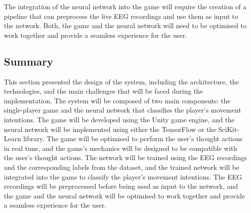 The integration of the neural network into the game will require the creation of a pipeline that can preprocess the live EEG recordings and use them as input to the network.
Both, the game and the neural network will need to be optimised to work together and provide a seamless experience for the user.

\subsection{Summary}
This section presented the design of the system, including the architecture, the technologies, and the main challenges that will be faced during the implementation.
The system will be composed of two main components: the single-player game and the neural network that classifies the player's movement intentions.
The game will be developed using the Unity game engine, and the neural network will be implemented using either the TensorFlow or the SciKit-Learn library.
The game will be optimised to perform the user's thought actions in real time, and the game's mechanics will be designed to be compatible with the user's thought actions.
The network will be trained using the EEG recordings and the corresponding labels from the dataset, and the trained network will be integrated into the game to classify the player's movement intentions.
The EEG recordings will be preprocessed before being used as input to the network, and the game and the neural network will be optimised to work together and provide a seamless experience for the user.
